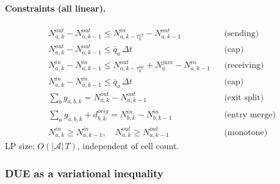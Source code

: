 \paragraph{Constraints (all linear).}
\begin{align}
  & N^{out}_{a,k} - N^{out}_{a,k-1}
      \le N^{in}_{a,k-\tau^{ff}_a} - N^{out}_{a,k-1}
    && \text{(sending)}
    \label{eq:so-ltm-send}\\
  & N^{out}_{a,k} - N^{out}_{a,k-1} \le \bar{q}_a\,\Delta t
    && \text{(cap)}\\
  & N^{in}_{a,k} - N^{in}_{a,k-1}
      \le N^{out}_{a,k-\tau^{bw}_a} + N^{jam}_a - N^{in}_{a,k-1}
    && \text{(receiving)}
    \label{eq:so-ltm-recv}\\
  & N^{in}_{a,k} - N^{in}_{a,k-1} \le \bar{q}_a\,\Delta t
    && \text{(cap)}\\
  & \textstyle\sum_b y_{a,b,k} = N^{out}_{a,k} - N^{out}_{a,k-1}
    && \text{(exit split)}\\
  & \textstyle\sum_a y_{a,b,k} + d^{orig}_{b,k}
      = N^{in}_{b,k} - N^{in}_{b,k-1}
    && \text{(entry merge)}\\
  & N^{in}_{a,k} \ge N^{in}_{a,k-1},\quad
    N^{out}_{a,k} \ge N^{out}_{a,k-1}
    && \text{(monotone)}
\end{align}
LP size: $O(|\mathcal{A}|\,T)$, independent of cell count.

\subsubsection{DUE as a variational inequality}
\label{sec:traffic-due-vi}

